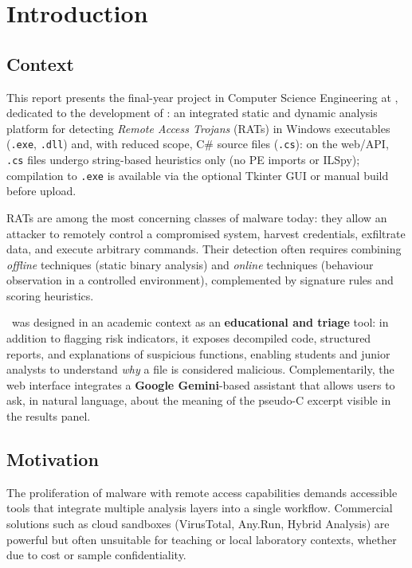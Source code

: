 \chapter{Introduction}
\label{ch:intro}

\section{Context}

This report presents the final-year project in Computer Science Engineering at \ubi,
dedicated to the development of \rat: an integrated static and dynamic analysis platform
for detecting \emph{Remote Access Trojans} (RATs) in Windows executables (\texttt{.exe},
\texttt{.dll}) and, with reduced scope, C\# source files (\texttt{.cs}): on the web/API,
\texttt{.cs} files undergo string-based heuristics only (no PE imports or ILSpy); compilation
to \texttt{.exe} is available via the optional Tkinter GUI or manual build before upload.

RATs are among the most concerning classes of malware today: they allow an attacker to
remotely control a compromised system, harvest credentials, exfiltrate data, and execute
arbitrary commands. Their detection often requires combining \emph{offline} techniques
(static binary analysis) and \emph{online} techniques (behaviour observation in a controlled
environment), complemented by signature rules and scoring heuristics.

\rat\ was designed in an academic context as an \textbf{educational and triage} tool:
in addition to flagging risk indicators, it exposes decompiled code, structured reports, and
explanations of suspicious functions, enabling students and junior analysts to understand
\emph{why} a file is considered malicious. Complementarily, the web interface integrates a
\textbf{Google Gemini}-based assistant that allows users to ask, in natural language, about
the meaning of the pseudo-C excerpt visible in the results panel.

\section{Motivation}

The proliferation of malware with remote access capabilities demands accessible tools that
integrate multiple analysis layers into a single workflow. Commercial solutions such as
cloud sandboxes (VirusTotal, Any.Run, Hybrid Analysis) are powerful but often unsuitable for
teaching or local laboratory contexts, whether due to cost or sample confidentiality.

